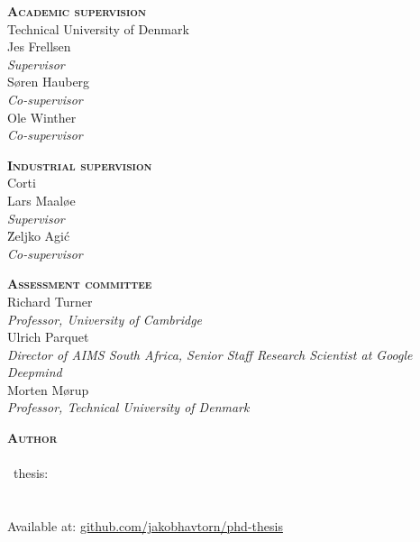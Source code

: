 

\thispagestyle{empty} %

\hfill\vfill

\noindent
\small%
\textsc{\textbf{Academic supervision}}\\
Technical University of Denmark
\medskip
\\Jes Frellsen\\
\textit{Supervisor}%
\medskip
\\Søren Hauberg\\
\textit{Co-supervisor}%
\medskip
\\Ole Winther\\
\textit{Co-supervisor}%
\medskip

\bigskip
\noindent
\textsc{\textbf{Industrial supervision}}\\
Corti%
\medskip
\\Lars Maaløe\\
\textit{Supervisor}%
\medskip
\\\u{Z}eljko Agi\'c\\
\textit{Co-supervisor}%
\medskip

\bigskip
\noindent
\textsc{\textbf{Assessment committee}}
\medskip
\\Richard Turner\\
\textit{Professor, University of Cambridge}
\medskip
\\Ulrich Parquet\\
\textit{Director of AIMS South Africa, Senior Staff Research Scientist at Google Deepmind}
\medskip
\\Morten Mørup\\
\textit{Professor, Technical University of Denmark} %
\medskip

\bigskip
\noindent
\textsc{\textbf{Author}}
\medskip
\\\thesisauthor\\
\thesistypeabbr\ thesis:\\
\textit{\thesistitle}\\
\textcopyright\ \thesismonth\ \thesisyear\\
Available at: \href{https://github.com/JakobHavtorn/phd-thesis}{github.com/jakobhavtorn/phd-thesis}

\normalsize
\normalfont
